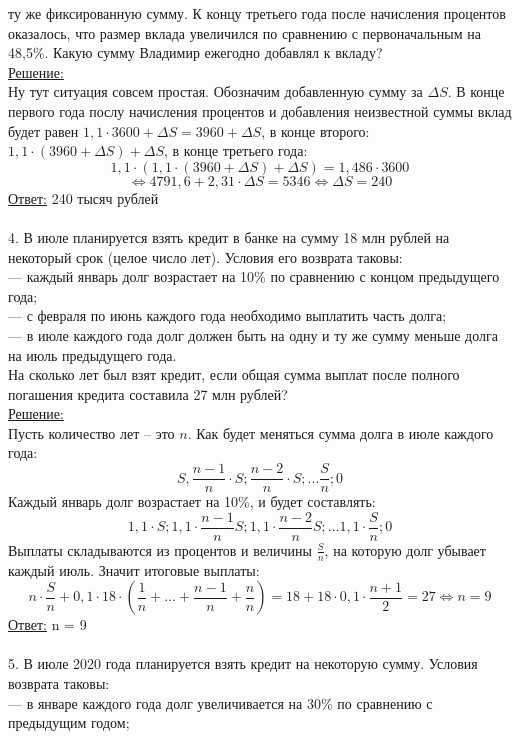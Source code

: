 \documentclass{article}
\begin{document}
ту же фиксированную сумму. К концу третьего года после 
начисления процентов оказалось, что размер вклада увеличился 
по сравнению с первоначальным на 48,5\%. Какую сумму Владимир
ежегодно добавлял к вкладу?
\\
\underline{Решение:}
\\
Ну тут ситуация совсем простая. Обозначим добавленную сумму за \( \Delta S\). В конце первого
года послу начисления процентов и добавления неизвестной суммы вклад будет равен 
\( 1,1\cdot 3600 + \Delta S = 3960 + \Delta S\), в конце второго: 
\( 1,1\cdot (3960 + \Delta S) + \Delta S \), в конце третьего года:
\[ 1,1 \cdot ( 1,1\cdot (3960 + \Delta S) + \Delta S) = 1,486 \cdot 3600 \]
\[ \Leftrightarrow 4791,6 + 2,31 \cdot \Delta S = 5346 
\Leftrightarrow \Delta S = 240 \]
\underline{Ответ:} 240 тысяч рублей
\\
\\
4. В июле планируется взять кредит в банке на сумму 18 млн рублей на некоторый срок (целое число лет). Условия его возврата таковы:\\
— каждый январь долг возрастает на 10\% по сравнению с концом предыдущего года;
\\
— с февраля по июнь каждого года необходимо выплатить часть долга;
\\
— в июле каждого года долг должен быть на одну и ту же сумму меньше долга на июль предыдущего года.
\\
На сколько лет был взят кредит, если общая сумма выплат после полного погашения кредита составила 27 млн рублей?
\\
\underline{Решение:}
\\
Пусть количество лет -- это $n$. Как будет меняться сумма долга в июле каждого года:
\[ S, \frac{n-1}{n} \cdot S; \frac{n-2}{n} \cdot S; ... \frac{S}{n}; 0 \]
Каждый январь долг возрастает на 10\%, и будет составлять:
\[ 1,1 \cdot S; 1,1 \cdot\frac{n-1}{n}S; 1,1\cdot \frac{n-2}{n}  S; ... 1,1 \cdot \frac{S}{n}; 0\]
Выплаты складываются из процентов и величины \( \frac{S}{n}\), на которую долг убывает каждый июль.
Значит итоговые выплаты:
\[ n\cdot \frac{S}{n} + 0,1 \cdot 18\cdot \left( \frac{1}{n} + ... + \frac{n - 1}{n} +
\frac{n}{n}\right) =  18 + 18 \cdot 0,1 \cdot \frac{n + 1}{2} = 27
\Leftrightarrow n = 9\]
\underline{Ответ:} n = 9
\\
\\
5. В июле 2020 года планируется взять кредит на некоторую сумму. Условия возврата таковы:
\\
— в январе каждого года долг увеличивается на 30\% по сравнению с предыдущим годом;
\end{document}

